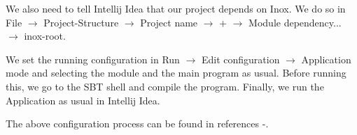 We also need to tell Intellij Idea that our project depends on Inox. We do so in File $\to$ Project-Structure $\to$ Project name $\to$ + $\to$ Module dependency... $\to$ inox-root.

\begin{figure}[H]
\centering
{}
\end{figure}

We set the running configuration in Run $\to$ Edit configuration $\to$ Application mode and selecting the module and the main program as usual. Before running this, we go to the SBT shell and compile the program. Finally, we run the Application as usual in Intellij Idea. 

The above configuration process can be found in references \cite{ref1}-\cite{ref7}.